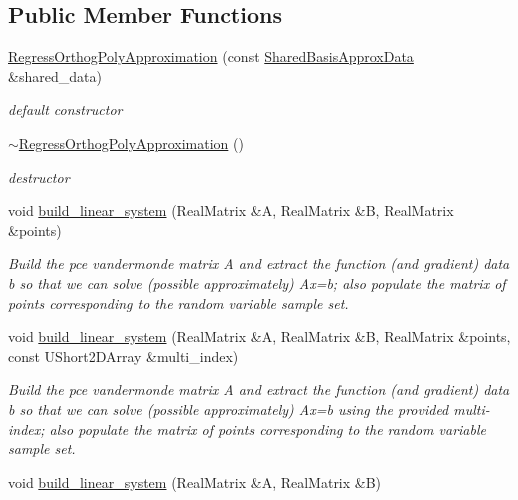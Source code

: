 \subsection*{Public Member Functions}
\begin{DoxyCompactItemize}
\item 
\hyperlink{classPecos_1_1RegressOrthogPolyApproximation_a45958a30da42872849de46c6a4c5f3b2}{Regress\+Orthog\+Poly\+Approximation} (const \hyperlink{classPecos_1_1SharedBasisApproxData}{Shared\+Basis\+Approx\+Data} \&shared\+\_\+data)\label{classPecos_1_1RegressOrthogPolyApproximation_a45958a30da42872849de46c6a4c5f3b2}

\begin{DoxyCompactList}\small\item\em default constructor \end{DoxyCompactList}\item 
\hyperlink{classPecos_1_1RegressOrthogPolyApproximation_a7d524ebb37fb0a57807a0e0a335672eb}{$\sim$\+Regress\+Orthog\+Poly\+Approximation} ()\label{classPecos_1_1RegressOrthogPolyApproximation_a7d524ebb37fb0a57807a0e0a335672eb}

\begin{DoxyCompactList}\small\item\em destructor \end{DoxyCompactList}\item 
void \hyperlink{classPecos_1_1RegressOrthogPolyApproximation_ae83af320003f04bcce689976b514fd9c}{build\+\_\+linear\+\_\+system} (Real\+Matrix \&A, Real\+Matrix \&B, Real\+Matrix \&points)\label{classPecos_1_1RegressOrthogPolyApproximation_ae83af320003f04bcce689976b514fd9c}

\begin{DoxyCompactList}\small\item\em Build the pce vandermonde matrix A and extract the function (and gradient) data b so that we can solve (possible approximately) Ax=b; also populate the matrix of points corresponding to the random variable sample set. \end{DoxyCompactList}\item 
void \hyperlink{classPecos_1_1RegressOrthogPolyApproximation_a6e3d3029730d8df2e8cd04d70cdb8c8c}{build\+\_\+linear\+\_\+system} (Real\+Matrix \&A, Real\+Matrix \&B, Real\+Matrix \&points, const U\+Short2\+D\+Array \&multi\+\_\+index)\label{classPecos_1_1RegressOrthogPolyApproximation_a6e3d3029730d8df2e8cd04d70cdb8c8c}

\begin{DoxyCompactList}\small\item\em Build the pce vandermonde matrix A and extract the function (and gradient) data b so that we can solve (possible approximately) Ax=b using the provided multi-\/index; also populate the matrix of points corresponding to the random variable sample set. \end{DoxyCompactList}\item 
void \hyperlink{classPecos_1_1RegressOrthogPolyApproximation_abbfb4fff2facc0982dbce0e7eab8b2fe}{build\+\_\+linear\+\_\+system} (Real\+Matrix \&A, Real\+Matrix \&B)\label{classPecos_1_1RegressOrthogPolyApproximation_abbfb4fff2facc0982dbce0e7eab8b2fe}


\end{DoxyCompactItemize}
